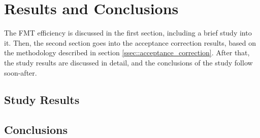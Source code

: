 \section{Results and Conclusions} \label{sec::resultsandconclusions}
    The FMT efficiency is discussed in the first section, including a brief study into it.
    Then, the second section goes into the acceptance correction results, based on the methodology described in section \ref{ssec::acceptance_correction}.
    After that, the study results are discussed in detail, and the conclusions of the study follow soon-after.

    
    

\subsection{Study Results}

\subsection{Conclusions}
